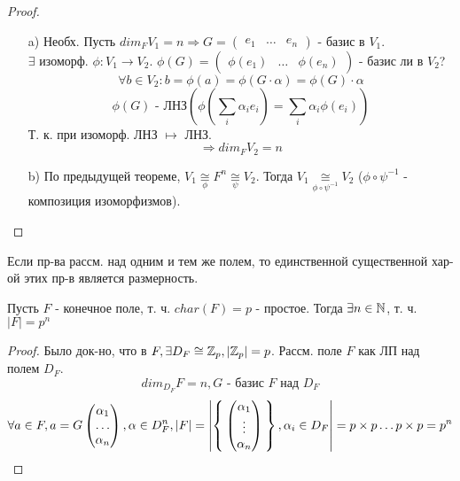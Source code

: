 \begin{proof}
\begin{itemize}
  \item [a) ] Необх. Пусть $dim_F V_1 = n \Rightarrow G = \begin{pmatrix} e_1 & \ldots & e_n \end{pmatrix}$ - базис в $V_1$. \\ 

    $\exists $ изоморф. $\phi: V_1 \rightarrow V_2$. $\phi(G) = \begin{pmatrix}\phi(e_1) & \ldots & \phi(e_n) \end{pmatrix}$ - базис ли в $V_2$? \\
    \[
    \forall b \in V_2 \colon b = \phi(a) = \phi(G \cdot \alpha) = \phi(G) \cdot \alpha
    \]
    \[
    \phi(G) \text{ - ЛНЗ} \left(\phi\left(\sum_{i}^{}\alpha_i e_i\right) = \sum_{i}^{}\alpha_i \phi(e_i)\right)
    \]
    Т. к. при изоморф. ЛНЗ $\mapsto$ ЛНЗ.
    \[
    \Rightarrow dim_F V_2 = n
    \]
  \item [b) ] По предыдущей теореме, $V_1 \underset{\phi}{\cong} F^{n} \underset{\psi}{\cong} V_2$. Тогда $V_1 \underset{\phi \circ \psi^{-1}}{\cong} V_2$ ($\phi \circ \psi^{-1}$ - композиция изоморфизмов).
\end{itemize}
\end{proof}
\begin{consequence}
Если пр-ва рассм. над одним и тем же полем, то единственной существенной хар-ой этих пр-в является размерность.
\end{consequence}
\begin{theorem}
Пусть $F$ - конечное поле, т. ч. $char(F) = p$ - простое. Тогда $\exists n \in \mathbb{N}$, т. ч. $\left|F\right| = p ^{n}$
\end{theorem}
\begin{proof}
 Было док-но, что в $F, \exists D_F \cong \mathbb{Z}_p, \left|\mathbb{Z}_p\right| = p$. Рассм. поле $F$ как ЛП над полем $D_F$.
 \[
   dim_{D_F} F = n, G \text{ - базис $F$ над $D_F$}
 \]
 \[
 \forall a \in F, a = G\begin{pmatrix}\alpha_1 \\ \ldots \\ \alpha_n \end{pmatrix}, \alpha \in D_F^{n}, \left|F\right| = \left|\Set{\begin{pmatrix}\alpha_1 \\ \vdots \\ \alpha_n \end{pmatrix}}, \alpha_i \in D_F\right| = p \times p \ldots p \times p = p^{n}
 \]
\end{proof}

